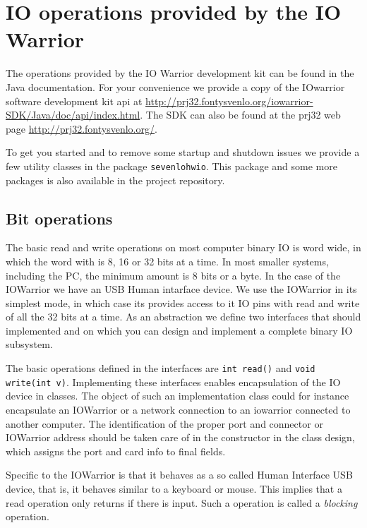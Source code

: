 \section{IO operations provided  by the IO Warrior}

The operations provided by the IO Warrior development kit can be found
in the Java documentation. For your convenience we provide a copy of
the IOwarrior software development kit  api at
\url{http://prj32.fontysvenlo.org/iowarrior-SDK/Java/doc/api/index.html}. 
The SDK can also be found at the prj32 web page \url{http://prj32.fontysvenlo.org/}.

To get you started and to remove some startup and shutdown issues we
provide a few utility classes in the package \lstinline{sevenlohwio}.
This package and some more packages is also available in the
project repository.


\subsection{Bit operations}
\lstset{language=Java}
The basic read and write operations on most computer binary IO is word
wide, in which the word with is 8, 16 or 32 bits at a time.
In most smaller systems, including the PC, the minimum amount is 8
bits or a byte. In the case of the IOWarrior we have an USB Human
intarface device. We use the IOWarrior in its simplest mode, in which
case its provides access to it IO pins with read and write of all the
32 bits at a time.
As an abstraction we define two interfaces that should implemented and
on which you can design and implement a complete binary IO subsystem.

The basic operations defined in the interfaces are 
\lstinline{int read()} and \lstinline{void write(int v)}. Implementing these
interfaces enables encapsulation of the IO device in classes. The
object of such an implementation class could for instance encapsulate
an IOWarrior or a network connection to an iowarrior connected to
another computer. The identification of the proper port and connector or
IOWarrior address should be taken care of in the constructor in the
class design, which assigns the port and card info to final fields.

Specific to the IOWarrior is that it behaves as a so called Human
Interface USB device, that is, it behaves similar to a keyboard or
mouse. This implies that a read operation only returns if there is
input. Such a operation is called a \textit{blocking} operation. 

